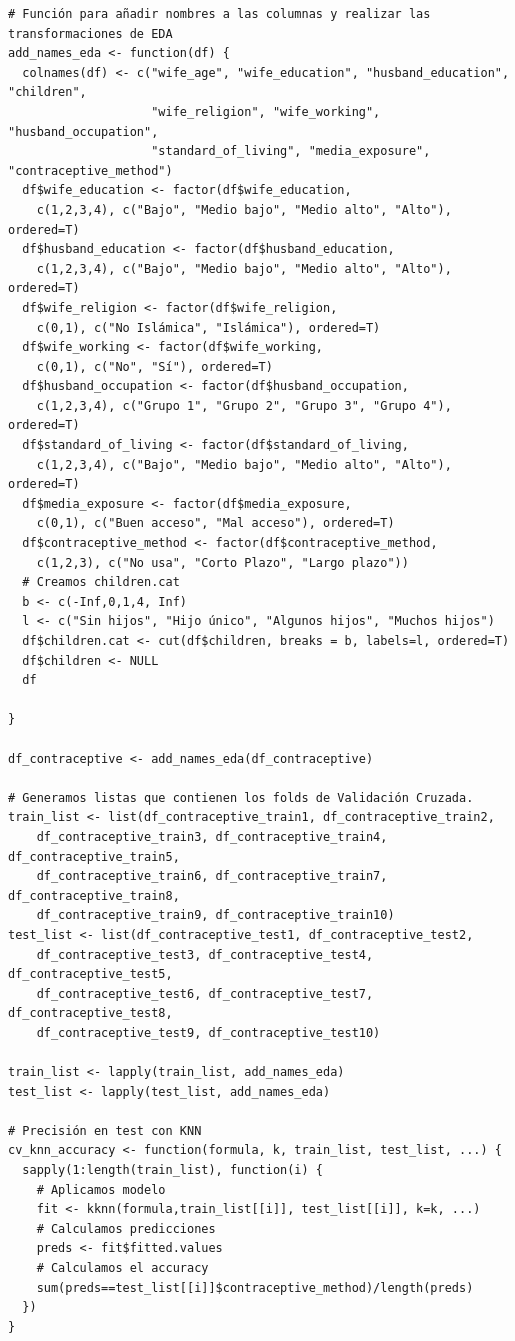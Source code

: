 \documentclass[a4paper,12pt, oneside]{book}
\begin{document}
\begin{verbatim}
# Función para añadir nombres a las columnas y realizar las transformaciones de EDA
add_names_eda <- function(df) {
  colnames(df) <- c("wife_age", "wife_education", "husband_education", "children", 
                    "wife_religion", "wife_working", "husband_occupation",
                    "standard_of_living", "media_exposure", "contraceptive_method")
  df$wife_education <- factor(df$wife_education, 
  	c(1,2,3,4), c("Bajo", "Medio bajo", "Medio alto", "Alto"), ordered=T)
  df$husband_education <- factor(df$husband_education, 
  	c(1,2,3,4), c("Bajo", "Medio bajo", "Medio alto", "Alto"), ordered=T)
  df$wife_religion <- factor(df$wife_religion, 
  	c(0,1), c("No Islámica", "Islámica"), ordered=T)
  df$wife_working <- factor(df$wife_working, 
  	c(0,1), c("No", "Sí"), ordered=T)
  df$husband_occupation <- factor(df$husband_occupation, 
  	c(1,2,3,4), c("Grupo 1", "Grupo 2", "Grupo 3", "Grupo 4"), ordered=T)
  df$standard_of_living <- factor(df$standard_of_living, 
  	c(1,2,3,4), c("Bajo", "Medio bajo", "Medio alto", "Alto"), ordered=T)
  df$media_exposure <- factor(df$media_exposure,
    c(0,1), c("Buen acceso", "Mal acceso"), ordered=T)
  df$contraceptive_method <- factor(df$contraceptive_method, 
  	c(1,2,3), c("No usa", "Corto Plazo", "Largo plazo"))
  # Creamos children.cat
  b <- c(-Inf,0,1,4, Inf)
  l <- c("Sin hijos", "Hijo único", "Algunos hijos", "Muchos hijos")
  df$children.cat <- cut(df$children, breaks = b, labels=l, ordered=T)
  df$children <- NULL
  df
  
}

df_contraceptive <- add_names_eda(df_contraceptive)

# Generamos listas que contienen los folds de Validación Cruzada.
train_list <- list(df_contraceptive_train1, df_contraceptive_train2, 
	df_contraceptive_train3, df_contraceptive_train4, df_contraceptive_train5,
	df_contraceptive_train6, df_contraceptive_train7, df_contraceptive_train8, 
	df_contraceptive_train9, df_contraceptive_train10)
test_list <- list(df_contraceptive_test1, df_contraceptive_test2,
    df_contraceptive_test3, df_contraceptive_test4, df_contraceptive_test5, 
    df_contraceptive_test6, df_contraceptive_test7, df_contraceptive_test8,
    df_contraceptive_test9, df_contraceptive_test10)

train_list <- lapply(train_list, add_names_eda)
test_list <- lapply(test_list, add_names_eda)

# Precisión en test con KNN
cv_knn_accuracy <- function(formula, k, train_list, test_list, ...) {
  sapply(1:length(train_list), function(i) {
    # Aplicamos modelo
    fit <- kknn(formula,train_list[[i]], test_list[[i]], k=k, ...)
    # Calculamos predicciones
    preds <- fit$fitted.values
    # Calculamos el accuracy
    sum(preds==test_list[[i]]$contraceptive_method)/length(preds)
  })
}


\end{verbatim}
\end{document}
